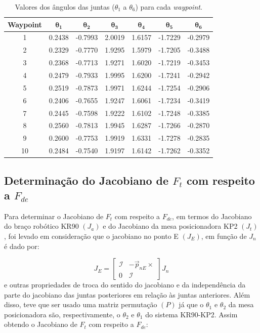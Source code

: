 \documentclass[10pt]{article}
\begin{document}
\begin{table}[h!]
    \centering
    \begin{tabular}{|c|c|c|c|c|c|c|}
    \hline
    \textbf{Waypoint} & $\boldsymbol{\theta_1}$ & $\boldsymbol{\theta_2}$ & $\boldsymbol{\theta_3}$ & $\boldsymbol{\theta_4}$ & $\boldsymbol{\theta_5}$ & $\boldsymbol{\theta_6}$ \\ \hline
    1 & 0.2438 & -0.7993 & 2.0019 & 1.6157 & -1.7229 & -0.2979 \\ \hline
    2 & 0.2329 & -0.7770 & 1.9295 & 1.5979 & -1.7205 & -0.3488 \\ \hline
    3 & 0.2368 & -0.7713 & 1.9271 & 1.6020 & -1.7219 & -0.3453 \\ \hline
    4 & 0.2479 & -0.7933 & 1.9995 & 1.6200 & -1.7241 & -0.2942 \\ \hline
    5 & 0.2519 & -0.7873 & 1.9971 & 1.6244 & -1.7254 & -0.2906 \\ \hline
    6 & 0.2406 & -0.7655 & 1.9247 & 1.6061 & -1.7234 & -0.3419 \\ \hline
    7 & 0.2445 & -0.7598 & 1.9222 & 1.6102 & -1.7248 & -0.3385 \\ \hline
    8 & 0.2560 & -0.7813 & 1.9945 & 1.6287 & -1.7266 & -0.2870 \\ \hline
    9 & 0.2600 & -0.7753 & 1.9919 & 1.6331 & -1.7278 & -0.2835 \\ \hline
    10 & 0.2484 & -0.7540 & 1.9197 & 1.6142 & -1.7262 & -0.3352 \\ \hline
    \end{tabular}
    \caption{Valores dos ângulos das juntas ($\theta_1$ a $\theta_6$) para cada \textit{waypoint}.}
    \label{tab:theta_values}
\end{table}
    

\subsection{Determinação do Jacobiano de $F_t$ com respeito a $F_{de}$}

\quad Para determinar o Jacobiano de $F_t$ com respeito a $F_{de}$, em termos do Jacobiano do braço
robótico KR90 \((J_a)\) e do Jacobiano da mesa posicionadora KP2 \((J_t)\),
foi levado em consideração que o jacobiano no ponto E $(J_E)$, em função de $J_n$ é dado por:

\begin{equation}
    J_E =
    \begin{bmatrix}
        \mathcal{I} & -\vec{p}_{nE} \times \\
        0 & \mathcal{I}
    \end{bmatrix}
    J_n
\end{equation}
e outras propriedades de troca do sentido do jacobiano e
da independência da parte do jacobiano das juntas posteriores em relação às juntas anteriores.
Além disso, teve que ser usado uma matriz permutação $(P)$ já que o $\theta_1$ e $\theta_2$ da mesa posicionadora
são, respectivamente, o $\theta_2$ e $\theta_1$ do sistema KR90-KP2.
Assim obtendo o Jacobiano de $F_t$ com respeito a $F_{de}$:
\end{document}
